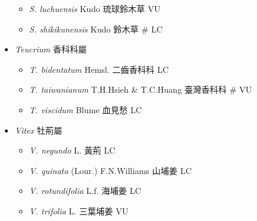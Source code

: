 \begin{itemize}
  \begin{itemize}
        \item[] \textit{S. luchuensis} Kudo  琉球鈴木草   VU
        \item[] \textit{S. shikikunensis} Kudo  鈴木草  \# LC
  \end{itemize}
 \item[] \textit{Teucrium} 香科科屬
                                
  \begin{itemize}
        \item[] \textit{T. bidentatum} Hemsl.  二齒香科科   LC
        \item[] \textit{T. taiwanianum} T.H.Hsieh \& T.C.Huang  臺灣香科科  \# VU
        \item[] \textit{T. viscidum} Blume  血見愁   LC
  \end{itemize}
 \item[] \textit{Vitex} 牡荊屬
                                
  \begin{itemize}
        \item[] \textit{V. negundo} L.  黃荊   LC
        \item[] \textit{V. quinata} (Lour.) F.N.Williams  山埔姜   LC
        \item[] \textit{V. rotundifolia} L.f.  海埔姜   LC
        \item[] \textit{V. trifolia} L.  三葉埔姜   VU
  \end{itemize}
  \end{itemize}
